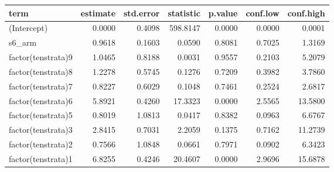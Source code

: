 \documentclass[
]{article}
\begin{document}
\begin{table}[H]
\centering
\begin{tabular}{l|r|r|r|r|r|r}
\hline
term & estimate & std.error & statistic & p.value & conf.low & conf.high\\
\hline
(Intercept) & 0.0000 & 0.4098 & 598.8147 & 0.0000 & 0.0000 & 0.0001\\
\hline
s6\_arm & 0.9618 & 0.1603 & 0.0590 & 0.8081 & 0.7025 & 1.3169\\
\hline
factor(tenstrata)9 & 1.0465 & 0.8188 & 0.0031 & 0.9557 & 0.2103 & 5.2079\\
\hline
factor(tenstrata)8 & 1.2278 & 0.5745 & 0.1276 & 0.7209 & 0.3982 & 3.7860\\
\hline
factor(tenstrata)7 & 0.8227 & 0.6029 & 0.1048 & 0.7461 & 0.2524 & 2.6817\\
\hline
factor(tenstrata)6 & 5.8921 & 0.4260 & 17.3323 & 0.0000 & 2.5565 & 13.5800\\
\hline
factor(tenstrata)5 & 0.8019 & 1.0813 & 0.0417 & 0.8382 & 0.0963 & 6.6767\\
\hline
factor(tenstrata)3 & 2.8415 & 0.7031 & 2.2059 & 0.1375 & 0.7162 & 11.2739\\
\hline
factor(tenstrata)2 & 0.7566 & 1.0848 & 0.0661 & 0.7971 & 0.0902 & 6.3423\\
\hline
factor(tenstrata)1 & 6.8255 & 0.4246 & 20.4607 & 0.0000 & 2.9696 & 15.6878\\
\hline
\end{tabular}
\end{table}
\end{document}
